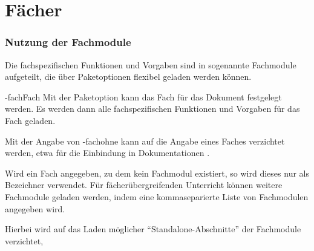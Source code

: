 \part{Fächer}
	\label{sec:faecher}
	
	\section{Nutzung der Fachmodule}
	
	Die fachspezifischen Funktionen und Vorgaben sind in sogenannte
	Fachmodule aufgeteilt, die über Paketoptionen flexibel geladen
	werden können.
	
	\begin{options}
		\keyval-{fach}{Fach}
			Mit der Paketoption  kann das Fach für das
			Dokument festgelegt werden. Es werden dann alle
			fachspezifischen Funktionen und Vorgaben für das Fach
			geladen. 
			
			Mit der Angabe von \keyis-{fach}{ohne} kann auf die Angabe
			eines Faches verzichtet werden, etwa für die Einbindung in
			Dokumentationen \etc.
			
			Wird ein Fach angegeben, zu dem kein Fachmodul existiert,
			so wird dieses nur als Bezeichner verwendet.
			Für fächerübergreifenden Unterricht können weitere
			Fachmodule geladen werden, indem eine kommaseparierte
			Liste von Fachmodulen angegeben wird.
			
			Hierbei wird auf das Laden möglicher
			\enquote{Standalone-Abschnitte} der Fachmodule verzichtet, 
			\vgl\space{}
	\end{options}
	


